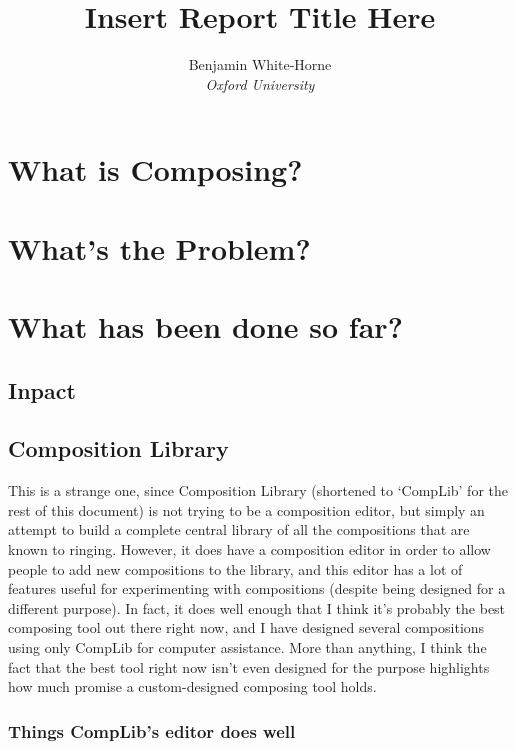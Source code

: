 \documentclass[12pt]{article}
\title{Insert Report Title Here}
\author{Benjamin White-Horne \\ \emph{Oxford University}}
\begin{document}
\maketitle
\pagebreak

\section{What is Composing?}

\section{What's the Problem?}

\section{What has been done so far?}

\subsection{Inpact}

\subsection{Composition Library}

This is a strange one, since Composition Library (shortened to `CompLib' for the rest of this
document) is not trying to be a composition editor, but simply an attempt to build a complete
central library of all the compositions that are known to ringing.  However, it does have a
composition editor in order to allow people to add new compositions to the library, and this
editor has a lot of features useful for experimenting with compositions (despite being designed for
a different purpose).  In fact, it does well enough that I think it's probably the best composing
tool out there right now, and I have designed several compositions using only CompLib for computer
assistance.  More than anything, I think the fact that the best tool right now isn't even designed
for the purpose highlights how much promise a custom-designed composing tool holds.

\subsubsection{Things CompLib's editor does well}
\end{document}
